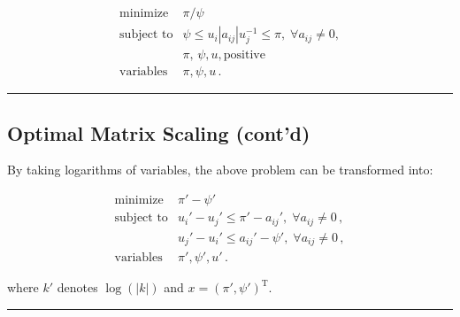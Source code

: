 \documentclass[]{article}
\begin{document}
\[\begin{array}{ll}
  \text{minimize}   &   \pi/\psi  \\
  \text{subject to} &   \psi \leq u_i |a_{ij}| u_j^{-1} \leq \pi, \; \forall a_{ij} \neq 0 , \\
                    &   \pi, \, \psi, u, \text{positive} \\
  \text{variables}  &   \pi, \psi, u \, .
  \end{array}\]

\begin{center}\rule{0.5\linewidth}{\linethickness}\end{center}

\hypertarget{optimal-matrix-scaling-contd}{%
\subsection{Optimal Matrix Scaling
(cont'd)}\label{optimal-matrix-scaling-contd}}

By taking logarithms of variables, the above problem can be transformed
into:

\[\begin{array}{ll}
  \text{minimize}   &   \pi' - \psi'  \\
  \text{subject to} &   u_i' -  u_j'  \leq \pi' - a_{ij}', \; \forall a_{ij} \neq 0 \,, \\
                    &   u_j' -  u_i' \leq a_{ij}' - \psi', \; \forall a_{ij} \neq 0 \,, \\
  \text{variables}  &   \pi', \psi', u' \, .
  \end{array}\]

where \(k'\) denotes \(\log( | k | )\) and
\(x = (\pi', \psi' )^{ \mathrm{ T } }\).

\begin{center}\rule{0.5\linewidth}{\linethickness}\end{center}
\end{document}
